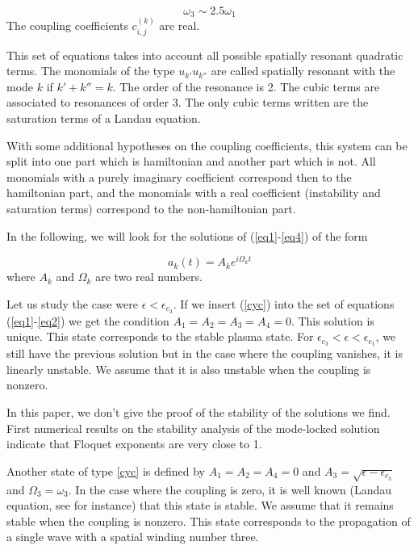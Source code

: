 \begin{equation}\label{relatom}
\omega_3 \sim 2.5\omega_1
\end{equation}
The coupling coefficients $c^{(k)}_{i,j}$ are real.

\begin{rem}
This set of equations takes into account all possible
spatially resonant quadratic terms. 
The monomials of the type $u_{k'}u_{k''}$  are
called  spatially resonant with the
mode $k$ if $k'+k''=k$. 
The order of the resonance is 2. The cubic terms
are associated to resonances of order 3. The only cubic terms
written are the saturation terms of a Landau equation.
\end{rem}

\begin{rem}
With some additional hypotheses on the coupling coefficients,
this system can be split into one part which is hamiltonian
and another part which is not. All  monomials with a purely imaginary 
coefficient correspond then to the hamiltonian part, and the
monomials with a real coefficient (instability and saturation terms)
correspond to the non-hamiltonian part.
\end{rem}

In the following, we will look for the solutions
of (\ref{eq1}-\ref{eq4}) of the form

\begin{equation}\label{cyc}
a_k(t)=A_k e^{i\Omega_kt}
\end{equation}
where $A_k$ and $\Omega_k$ are two real numbers.

Let us study the case were $\epsilon<\epsilon_{c_3}$.
If we insert (\ref{cyc}) into the set of equations
(\ref{eq1}-\ref{eq2}) we get the condition
$A_1=A_2=A_3=A_4=0$. This solution is unique.
This state corresponds to the stable plasma state.
For $\epsilon_{c_3}<\epsilon<\epsilon_{c_1}$, we still have  the
previous solution but in the case where the coupling vanishes,
it is linearly unstable. We assume that it is also unstable
when the coupling is nonzero.

\begin{rem}
In this paper, we don't give the proof of the 
stability of the solutions we find. First numerical results on the
stability analysis of the mode-locked solution
indicate that Floquet exponents are very close to 1.
\end{rem}

Another state of type \ref{cyc} is defined by 
$A_1=A_2=A_4=0$ and $A_3=\sqrt{\epsilon-\epsilon_{c_3}}$ and
$\Omega_3=\omega_3$. In the case where the coupling is zero, 
it is well known (Landau equation, see \cite{hohenberg93} for instance)
that this state is stable.
We assume that it remains stable when the coupling is nonzero.
This state corresponds to the propagation of a single wave
with a spatial winding number three.

